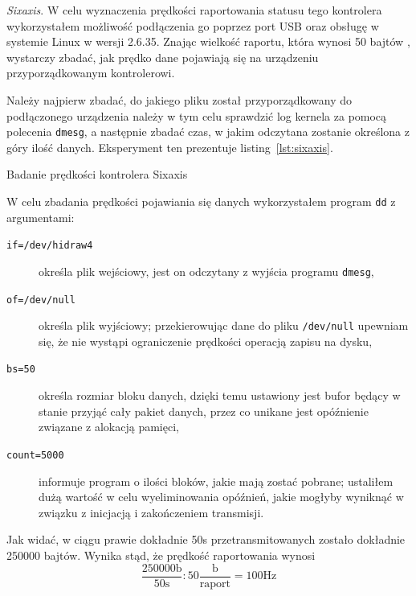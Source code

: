\textsl{Sixaxis}. W celu wyznaczenia prędkości raportowania statusu tego kontrolera wykorzystałem możliwość podłączenia go poprzez port USB oraz obsługę w systemie Linux w wersji 2.6.35. Znając wielkość raportu, która wynosi 50 bajtów \citep{Br10}, wystarczy zbadać, jak prędko dane pojawiają się na urządzeniu przyporządkowanym kontrolerowi. 

Należy najpierw zbadać, do jakiego pliku został przyporządkowany do podłączonego urządzenia \ppauza należy w tym celu sprawdzić log kernela za pomocą polecenia \texttt{dmesg}, a następnie zbadać czas, w jakim odczytana zostanie określona z góry ilość danych. Eksperyment ten prezentuje listing~\ref{lst:sixaxis}.

\begin{listing}
  
  \caption{Badanie prędkości kontrolera Sixaxis}
  \label{lst:sixaxis}
\end{listing}

W celu zbadania prędkości pojawiania się danych wykorzystałem program \texttt{dd} z argumentami:
\begin{description}
 \item[\texttt{if=/dev/hidraw4}] określa plik wejściowy, jest on odczytany z wyjścia programu \texttt{dmesg},
 \item[\texttt{of=/dev/null}] określa plik wyjściowy; przekierowując dane do pliku \texttt{/dev/null} upewniam się, że nie wystąpi ograniczenie prędkości operacją zapisu na dysku,
 \item[\texttt{bs=50}] określa rozmiar bloku danych, dzięki temu ustawiony jest bufor będący w stanie przyjąć cały pakiet danych, przez co unikane jest opóźnienie związane z alokacją pamięci,
 \item[\texttt{count=5000}] informuje program o ilości bloków, jakie mają zostać pobrane; ustaliłem dużą wartość w celu wyeliminowania opóźnień, jakie mogłyby wyniknąć w związku z inicjacją i zakończeniem transmisji.
\end{description}

Jak widać, w ciągu prawie dokładnie 50s przetransmitowanych zostało dokładnie 250000 bajtów. Wynika stąd, że prędkość raportowania wynosi
\begin{equation}
 \frac{250000\textrm{b}}{50\textrm{s}} : 50\frac{\textrm{b}}{\textrm{raport}} = 100\textrm{Hz}
\end{equation}

